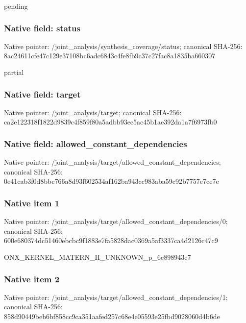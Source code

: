 \documentclass[10pt,a4paper]{article}
\begin{document}
\begingroup\raggedright\sloppy pending\par\endgroup

\subsubsection{Native field: status}
Native pointer: /joint\_\allowbreak{}analysis/synthesis\_\allowbreak{}coverage/status; canonical SHA-256: 8ac24611cfe47c129e37108bc6adc6843c4fe8fb9c37c27fac8a1835ba660307

\begingroup\raggedright\sloppy partial\par\endgroup

\subsubsection{Native field: target}
Native pointer: /joint\_\allowbreak{}analysis/target; canonical SHA-256: ca2e122318f1822d9839c4f859f80a5adbb93ec5ac45b1ae392da1a7f6973fb0

\subsubsection{Native field: allowed\_\allowbreak{}constant\_\allowbreak{}dependencies}
Native pointer: /joint\_\allowbreak{}analysis/target/allowed\_\allowbreak{}constant\_\allowbreak{}dependencies; canonical SHA-256: 0e41cab3f0d8bbc766a8d93f602534af162ba943cc983aba59c92b7757e7ce7e

\subsubsection{Native item 1}
Native pointer: /joint\_\allowbreak{}analysis/target/allowed\_\allowbreak{}constant\_\allowbreak{}dependencies/0; canonical SHA-256: 600e680374dc51460ebcbc9f1883e7fa5828dac0369a5af3337ca4d2126c47c9

\begingroup\raggedright\sloppy ONX\_\allowbreak{}KERNEL\_\allowbreak{}MATERN\_\allowbreak{}H\_\allowbreak{}UNKNOWN\_\allowbreak{}p\_\allowbreak{}6e898943e7\par\endgroup

\subsubsection{Native item 2}
Native pointer: /joint\_\allowbreak{}analysis/target/allowed\_\allowbreak{}constant\_\allowbreak{}dependencies/1; canonical SHA-256: 858d90449beb6bf858cc9ca351aafed257c68e4e05593e25fbd9028060d4b6de
\end{document}
